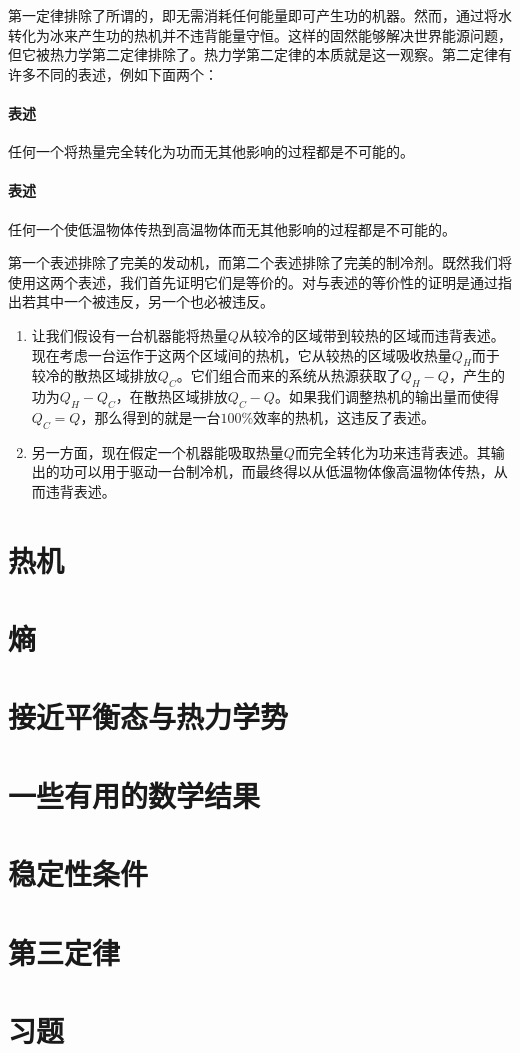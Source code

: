 
	第一定律排除了所谓的，即无需消耗任何能量即可产生功的机器。然而，通过将水转化为冰来产生功的热机并不违背能量守恒。这样的固然能够解决世界能源问题，但它被热力学第二定律排除了。热力学第二定律的本质就是这一观察。第二定律有许多不同的表述，例如下面两个：

	\paragraph{表述}任何一个将热量完全转化为功而无其他影响的过程都是不可能的。

	\paragraph{表述}任何一个使低温物体传热到高温物体而无其他影响的过程都是不可能的。

	第一个表述排除了完美的发动机，而第二个表述排除了完美的制冷剂。既然我们将使用这两个表述，我们首先证明它们是等价的。对与表述的等价性的证明是通过指出若其中一个被违反，另一个也必被违反。

	\begin{enumerate}[label=(\alph*)]
		\item 让我们假设有一台机器能将热量$Q$从较冷的区域带到较热的区域而违背表述。现在考虑一台运作于这两个区域间的热机，它从较热的区域吸收热量$Q_H$而于较冷的散热区域排放$Q_C$。它们组合而来的系统从热源获取了\(Q_H-Q\)，产生的功为\(Q_H-Q_C\)，在散热区域排放\(Q_C-Q\)。如果我们调整热机的输出量而使得\(Q_C=Q\)，那么得到的就是一台\(100\%\)效率的热机，这违反了表述。
		\item 另一方面，现在假定一个机器能吸取热量$Q$而完全转化为功来违背表述。其输出的功可以用于驱动一台制冷机，而最终得以从低温物体像高温物体传热，从而违背表述。
	\end{enumerate}

\section{热机}
\section{熵}
\section{接近平衡态与热力学势}
\section{一些有用的数学结果}
\section{稳定性条件}
\section{第三定律}
\section*{习题}